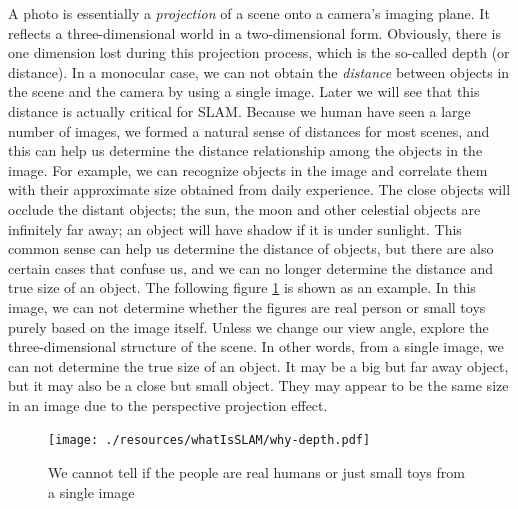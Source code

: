 A photo is essentially a \emph{projection} of a scene onto a camera's imaging plane. It reflects a three-dimensional world in a two-dimensional form. Obviously, there is one dimension lost during this projection process, which is the so-called depth (or distance). In a monocular case, we can not obtain the \emph{distance} between objects in the scene and the camera by using a single image. Later we will see that this distance is actually critical for SLAM. Because we human have seen a large number of images, we formed a natural sense of distances for most scenes, and this can help us determine the distance relationship among the objects in the image. For example, we can recognize objects in the image and correlate them with their approximate size obtained from daily experience. The close objects will occlude the distant objects; the sun, the moon and other celestial objects are infinitely far away; an object will have shadow if it is under sunlight. This common sense can help us determine the distance of objects, but there are also certain cases that confuse us, and we can no longer determine the distance and true size of an object. The following figure \ref{fig:why-depth} is shown as an example. In this image, we can not determine whether the figures are real person or small toys purely based on the image itself. Unless we change our view angle, explore the three-dimensional structure of the scene. In other words, from a single image, we can not determine the true size of an object. It may be a big but far away object, but it may also be a close but small object. They may appear to be the same size in an image due to the perspective projection effect.

\begin{figure}
	\centering
	\texttt{[image: ./resources/whatIsSLAM/why-depth.pdf]}
	\caption{We cannot tell if the people are real humans or just small toys from a single image}
	\label{fig:why-depth}
\end{figure}

